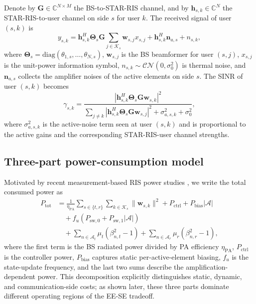 \documentclass[journal]{IEEEtran}
\begin{document}
Denote by $\mathbf{G}\in\mathbb{C}^{N\times M}$ the BS-to-STAR-RIS channel, and by $\mathbf{h}_{s,k}\in\mathbb{C}^N$ the STAR-RIS-to-user channel on side $s$ for user $k$. The received signal of user $(s,k)$ is
\begin{equation}
y_{s,k}=\mathbf{h}_{s,k}^H\mathbf{\Theta}_s\mathbf{G}
\sum_{j\in\mathcal{K}_s}\mathbf{w}_{s,j}x_{s,j}
+\mathbf{h}_{s,k}^H\mathbf{n}_{a,s}+n_{s,k},
\label{eq:received}
\end{equation}
where $\mathbf{\Theta}_s=\mathrm{diag}(\theta_{1,s},\ldots,\theta_{N,s})$, $\mathbf{w}_{s,j}$ is the BS beamformer for user $(s,j)$, $x_{s,j}$ is the unit-power information symbol, $n_{s,k}\sim\mathcal{CN}(0,\sigma_0^2)$ is thermal noise, and $\mathbf{n}_{a,s}$ collects the amplifier noises of the active elements on side $s$. The SINR of user $(s,k)$ becomes
\begin{equation}
\gamma_{s,k}=
\frac{\left|\mathbf{h}_{s,k}^H\mathbf{\Theta}_s\mathbf{G}\mathbf{w}_{s,k}\right|^2}
{\sum_{j\neq k}\left|\mathbf{h}_{s,k}^H\mathbf{\Theta}_s\mathbf{G}\mathbf{w}_{s,j}\right|^2
+\sigma_{a,s,k}^2+\sigma_0^2},
\label{eq:sinr_full}
\end{equation}
where $\sigma_{a,s,k}^2$ is the active-noise term seen at user $(s,k)$ and is proportional to the active gains and the corresponding STAR-RIS-user channel strengths.

\subsection{Three-part power-consumption model}
Motivated by recent measurement-based RIS power studies \cite{wang2023static,wang2024practical}, we write the total consumed power as
\begin{equation}
\begin{aligned}
P_{\mathrm{tot}}
&=\frac{1}{\eta_{\mathrm{PA}}}
\sum_{s\in\{t,r\}}\sum_{k\in\mathcal{K}_s}\|\mathbf{w}_{s,k}\|^2
+P_{\mathrm{ctrl}}+P_{\mathrm{bias}}|\mathcal{A}|  \\
&\quad +f_u\!\left(P_{\mathrm{sw},0}+P_{\mathrm{sw},1}|\mathcal{A}|\right) \\
&\quad +\sum_{n\in\mathcal{A}_t}\mu_t(\beta_{n,t}^2-1)
+\sum_{n\in\mathcal{A}_r}\mu_r(\beta_{n,r}^2-1),
\end{aligned}
\label{eq:power_model}
\end{equation}
where the first term is the BS radiated power divided by PA efficiency $\eta_{\mathrm{PA}}$, $P_{\mathrm{ctrl}}$ is the controller power, $P_{\mathrm{bias}}$ captures static per-active-element biasing, $f_u$ is the state-update frequency, and the last two sums describe the amplification-dependent power. This decomposition explicitly distinguishes static, dynamic, and communication-side costs; as shown later, these three parts dominate different operating regions of the EE-SE tradeoff.
\end{document}
